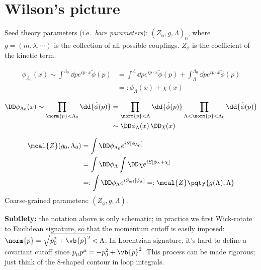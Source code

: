 \documentclass[a4paper
	,10pt
]{article}
\begin{document}
\section{Wilson's picture}
	Seed theory parameters (i.e.\ \emph{bare parameters}):
	$(Z_\phi,g,\Lambda)_0$, where $g = (m,\lambda,\cdots)$ is the collection of all possible couplings. $Z_\phi$ is the coefficient of the kinetic term.
	
	\begin{equation}
	\begin{aligned}
	  \phi_{\Lambda_0}(x)
	  \sim \int^{\Lambda_0} \dd{p}
	    e^{ip\cdot x}
	    \tilde{\phi}(p)
	  &= \int^{\Lambda} \dd{p}
	    e^{ip\cdot x}
	    \tilde{\phi}(p)
	    + \int_{\Lambda}^{\Lambda_0} \dd{p}
	    e^{ip\cdot x}
	    \tilde{\phi}(p) \\
	  &=\colon \phi_{\Lambda}(x) + \chi(x)
	\end{aligned}
	\end{equation}
	
	\begin{equation}
	\begin{aligned}
	  \DD\phi_{\Lambda_0}(x)
	  \sim \prod_{\norm{p} < \Lambda_0}
	    \dd{\tilde{\phi}(p)}
	  &= \prod_{\norm{p} < \Lambda}
	    \dd{\tilde{\phi}(p)}
	    \prod_{\Lambda < \norm{p} < \Lambda_0}
	    \dd{\tilde{\phi}(p)} \\
	  &\sim
	    \DD\phi_{\Lambda}(x)\,
	    \DD\chi(x)
	\end{aligned}
	\end{equation}
	
	\begin{equation}
	\begin{aligned}
	  \mcal{Z} (g_0,\Lambda_0)
	  &= \int \DD\phi_{\Lambda_0}
	      e^{iS[\phi_{\Lambda_0}]} \\
	  &= \int \DD\phi_{\Lambda}
	    \int \DD\chi
	      e^{iS[\phi_\Lambda + \chi]} \\
	  &=: \int \DD\phi_{\Lambda}
	      e^{iS_{\mathrm{eff}} [\phi_\Lambda]}
	  =: \mcal{Z}\pqty{g(\Lambda),\Lambda}
	\end{aligned}
	\end{equation}
	Coarse-grained parameters: $(Z_\phi,g,\Lambda)$.
	
	\textbf{Subtlety:} the notation above is only schematic; in practice we
	first Wick-rotate to Euclidean signature, so that the momentum cutoff is
	easily imposed: $\norm{p} = \sqrt{p_0^2 + \vb{p}^2} < \Lambda$. In
	Lorentzian signature, it's hard to define a covariant cutoff since
	$p_\mu p^\mu = - p_0^2 + \vb{p}^2$. This process can be made rigorous;
	just think of the 8-shaped contour in loop integrals.
	
\end{document}
